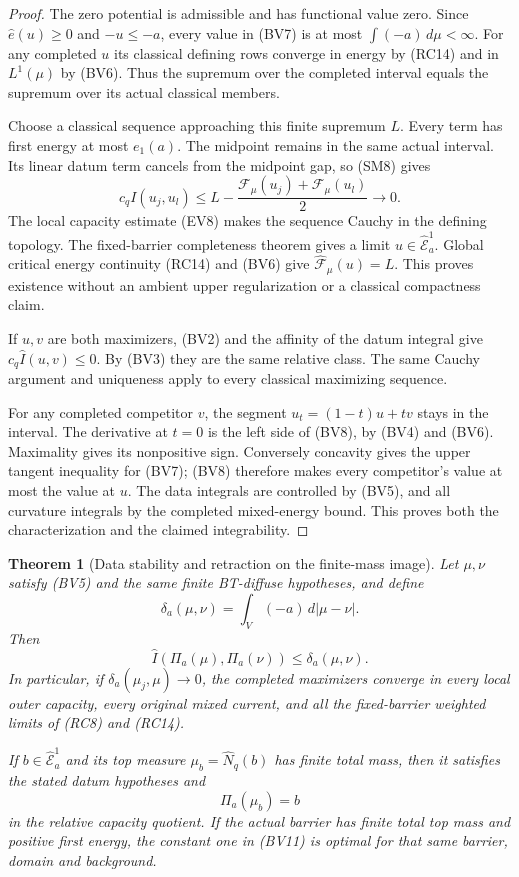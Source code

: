 \documentclass[11pt,a4paper]{article}
\numberwithin{equation}{section}
\newtheorem{theorem}{Theorem}[section]
\theoremstyle{definition}
\theoremstyle{remark}
\begin{document}
\begin{proof}
The zero potential is admissible and has functional
value zero.  Since $\widehat e(u)\geq0$ and
$-u\leq-a$, every value in (BV7) is at most
$\int(-a)\,d\mu<\infty$.
For any completed $u$ its classical defining
rows converge in energy by (RC14) and in
$L^1(\mu)$ by (BV6).
Thus the supremum over the completed interval
equals the supremum over its actual classical
members.

Choose a classical sequence approaching this
finite supremum $L$.
Every term has first energy at most $e_1(a)$.
The midpoint remains in the same actual interval.
Its linear datum term cancels from the midpoint
gap, so (SM8) gives
\[
 c_q I(u_j,u_l)
       \leq L-\frac{\mathcal F_\mu(u_j)+
                              \mathcal F_\mu(u_l)}2\longrightarrow0.
 \tag{BV9}
\]
The local capacity estimate (EV8) makes the
sequence Cauchy in the defining topology.
The fixed-barrier completeness theorem gives
a limit $u\in\widehat{\mathcal E}^1_a$.
Global critical energy continuity (RC14) and
(BV6) give
$\widehat{\mathcal F}_\mu(u)=L$.
This proves existence without an ambient upper
regularization or a classical compactness claim.

If $u,v$ are both maximizers, (BV2) and the
affinity of the datum integral give
$c_q\widehat I(u,v)\leq0$.
By (BV3) they are the same relative class.
The same Cauchy argument and uniqueness apply
to every classical maximizing sequence.

For any completed competitor $v$, the segment
$u_t=(1-t)u+tv$ stays in the interval.
The derivative at $t=0$ is the left side of
(BV8), by (BV4) and (BV6).
Maximality gives its nonpositive sign.
Conversely concavity gives the upper tangent
inequality for (BV7); (BV8) therefore makes
every competitor's value at most the value
at $u$.  The data integrals are controlled
by (BV5), and all curvature integrals by
the completed mixed-energy bound.
This proves both the characterization and
the claimed integrability.
\end{proof}

\begin{theorem}[Data stability and retraction on the finite-mass image]
\label{thm:r11-completed-barrier-data-stability}
Let $\mu,\nu$ satisfy (BV5) and the same
finite BT-diffuse hypotheses, and define
\[
                    \delta_a(\mu,\nu)
                         =\int_V(-a)\,d|\mu-\nu|.
 \tag{BV10}
\]
Then
\[
 \widehat I(\Pi_a(\mu),\Pi_a(\nu))
       \leq\delta_a(\mu,\nu).
 \tag{BV11}
\]
In particular, if $\delta_a(\mu_j,\mu)\to0$,
the completed maximizers converge in every
local outer capacity, every original mixed
current, and all the fixed-barrier weighted
limits of (RC8) and (RC14).

If $b\in\widehat{\mathcal E}^1_a$ and its top
measure $\mu_b=\widehat N_q(b)$ has finite
total mass, then it satisfies the stated
datum hypotheses and
\[
                                \Pi_a(\mu_b)=b
 \tag{BV12}
\]
in the relative capacity quotient.
If the actual barrier has finite total top mass
and positive first energy, the constant one
in (BV11) is optimal for that same barrier,
domain and background.
\end{theorem}
\end{document}
